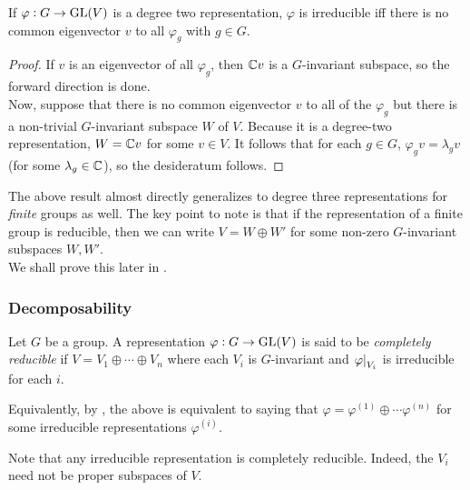 			\begin{fprop}
				\label{prop: deg 2 reps irreducible iff common eigenvec}
				If $\varphi : G \to \operatorname{GL}(V)$ is a degree two representation, $\varphi$ is irreducible iff there is no common eigenvector $v$ to all $\varphi_g$ with $g \in G$.
			\end{fprop}
			\begin{proof}
				If $v$ is an eigenvector of all $\varphi_g$, then $\mathbb{C} v$ is a $G$-invariant subspace, so the forward direction is done.\\
				Now, suppose that there is no common eigenvector $v$ to all of the $\varphi_g$ but there is a non-trivial $G$-invariant subspace $W$ of $V$. Because it is a degree-two representation, $W = \mathbb{C} v$ for some $v \in V$. It follows that for each $g\in G$, $\varphi_g v = \lambda_g v$ (for some $\lambda_g \in \mathbb{C}$), so the desideratum follows.
			\end{proof}

			\begin{remark}
				The above result almost directly generalizes to degree three representations for \emph{finite} groups as well. The key point to note is that if the representation of a finite group is reducible, then we can write $V = W \oplus W'$ for some non-zero $G$-invariant subspaces $W,W'$.\\
				We shall prove this later in .
			\end{remark}

		\subsubsection{Decomposability}

			\begin{fdef}
				Let $G$ be a group. A representation $\varphi : G \to \operatorname{GL}(V)$ is said to be \emph{completely reducible} if $V = V_1 \oplus \cdots \oplus V_n$ where each $V_i$ is $G$-invariant and $\left.\varphi\right|_{V_i}$ is irreducible for each $i$.
			\end{fdef}

			Equivalently, by , the above is equivalent to saying that $\varphi = \varphi^{(1)} \oplus \cdots \varphi^{(n)}$ for some irreducible representations $\varphi^{(i)}$.

			\begin{remark}
				Note that any irreducible representation is completely reducible. Indeed, the $V_i$ need not be proper subspaces of $V$.
			\end{remark}

